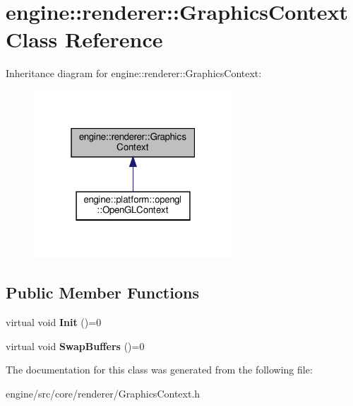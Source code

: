 \hypertarget{classengine_1_1renderer_1_1GraphicsContext}{}\section{engine\+:\+:renderer\+:\+:Graphics\+Context Class Reference}
\label{classengine_1_1renderer_1_1GraphicsContext}


Inheritance diagram for engine\+:\+:renderer\+:\+:Graphics\+Context\+:
\nopagebreak
\begin{figure}[H]
\begin{center}
\leavevmode
\includegraphics[width=211pt]{classengine_1_1renderer_1_1GraphicsContext__inherit__graph}
\end{center}
\end{figure}
\subsection*{Public Member Functions}
\begin{DoxyCompactItemize}
\item
\mbox{\label{classengine_1_1renderer_1_1GraphicsContext_ac7b94c5769b9464cdc2b71366fb0984b}}
virtual void {\bfseries Init} ()=0
\item
\mbox{\label{classengine_1_1renderer_1_1GraphicsContext_af4e7d29edd7912d32a07e139aef7a2f9}}
virtual void {\bfseries Swap\+Buffers} ()=0
\end{DoxyCompactItemize}


The documentation for this class was generated from the following file\+:\begin{DoxyCompactItemize}
\item
engine/src/core/renderer/Graphics\+Context.\+h\end{DoxyCompactItemize}

